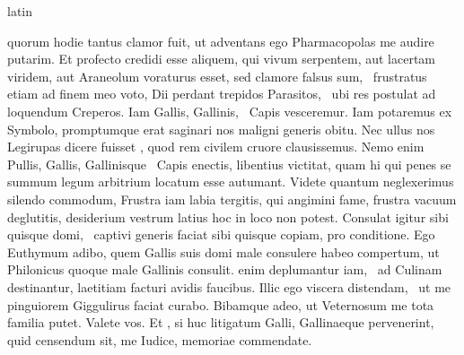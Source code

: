 \documentclass[12pt]{book}
\renewenvironment{latin}
    	{\begin{hyphenrules}{latin}}
    	{\end{hyphenrules}}
\begin{document}
\begin{pages}
\begin{latin}
\begin{Leftside}
                        quorum hodie tantus clamor fuit, 
                        ut adventans ego Pharmacopolas me audire putarim. 
                        Et profecto credidi esse aliquem, qui vivum serpentem, aut lacertam viridem, aut Araneolum voraturus esset, sed clamore falsus sum, ﻿\ampersand\ frustratus etiam ad finem meo voto, Dii perdant trepidos Parasitos, ﻿\ampersand\ ubi res postulat ad loquendum Creperos. 
                        Iam Gallis, Gallinis, ﻿\ampersand\ Capis vesceremur. 
                        Iam potaremus ex Symbolo, promptumque erat saginari nos maligni generis obitu. 
                        Nec ullus nos Legirupas dicere fuisset , 
                        quod rem civilem cruore clausissemus. 
                        Nemo enim Pullis, Gallis, Gallinisque ﻿\ampersand\ Capis enectis, libentius victitat, 
                        quam hi qui penes se summum legum arbitrium locatum esse autumant. 
                        Videte quantum neglexerimus silendo commodum, 
                        Frustra iam labia tergitis, qui angimini fame, frustra vacuum deglutitis, desiderium vestrum latius hoc in loco  non potest. 
                        Consulat igitur sibi quisque domi, ﻿\ampersand\ captivi generis faciat sibi quisque copiam, pro conditione. 
                        Ego Euthymum adibo, 
                        quem Gallis suis domi male consulere habeo compertum, 
                        ut Philonicus quoque male Gallinis consulit. 
                         enim deplumantur iam, ﻿\ampersand\ ad Culinam destinantur, laetitiam facturi avidis faucibus. 
                        Illic ego viscera distendam, ﻿\ampersand\ ut me pinguiorem Giggulirus faciat curabo. 
                        Bibamque adeo, 
                        ut Veternosum me tota familia putet. 
                        Valete vos. 
                        Et , si huc litigatum Galli, Gallinaeque pervenerint, 
                        quid censendum sit, me Iudice, memoriae commendate.
                    \pend 
        \endnumbering
        \end{Leftside}
        \end{latin}


\end{pages}
\end{document}
